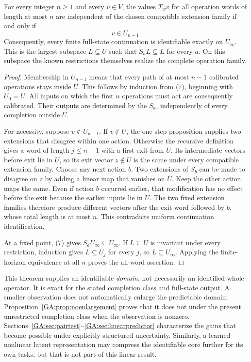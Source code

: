 \begin{GAtheorem}\label{GA:thm:core}
For every integer $n\ge1$ and every $v\in V$, the values $T_wv$ for all operation words of length at most $n$ are independent of the chosen compatible extension family if and only if
\[
v\in U_{n-1}.
\]
Consequently, every finite full-state continuation is identifiable exactly on $U_\infty$. This is the largest subspace $L\subseteq U$ such that $S_aL\subseteq L$ for every $a$. On this subspace the known restrictions themselves realize the complete operation family.
\end{GAtheorem}
\begin{proof}
Membership in $U_{n-1}$ means that every path of at most $n-1$ calibrated operations stays inside $U$. This follows by induction from (7), beginning with $U_0=U$. All inputs on which the first $n$ operations must act are consequently calibrated. Their outputs are determined by the $S_a$, independently of every completion outside $U$.

For necessity, suppose $v\notin U_{n-1}$. If $v\notin U$, the one-step proposition supplies two extensions that disagree within one action. Otherwise the recursive definition gives a word of length $j\le n-1$ with a first exit from $U$. Its intermediate vectors before exit lie in $U$, so its exit vector $z\notin U$ is the same under every compatible extension family. Choose any next action $b$. Two extensions of $S_b$ can be made to disagree on $z$ by adding a linear map that vanishes on $U$. Keep the other action maps the same. Even if action $b$ occurred earlier, that modification has no effect before the exit because the earlier inputs lie in $U$. The two fixed extension families therefore produce different vectors after the exit word followed by $b$, whose total length is at most $n$. This contradicts uniform continuation identification.

At a fixed point, (7) gives $S_aU_\infty\subseteq U_\infty$. If $L\subseteq U$ is invariant under every restriction, induction gives $L\subseteq U_j$ for every $j$, so $L\subseteq U_\infty$. Applying the finite-horizon equivalence at all $n$ proves the all-word assertion.
\end{proof}

This theorem supplies an identifiable \emph{domain}, not necessarily an identified whole operator. It is exact for the stated completion class and full-state output. A smaller observation does not automatically enlarge the predictable domain: Proposition~\ref{GA:prop:noenlargement} proves that it does not under the present unrestricted completion class when the observation is nonzero. Sections~\ref{GA:sec:pairtest}--\ref{GA:sec:linearpredictor} characterize the gains that become possible under explicitly structured uncertainty. Similarly, a learned nonlinear latent representation may compress the identifiable core further for its own tasks, but that is not part of this linear result.

